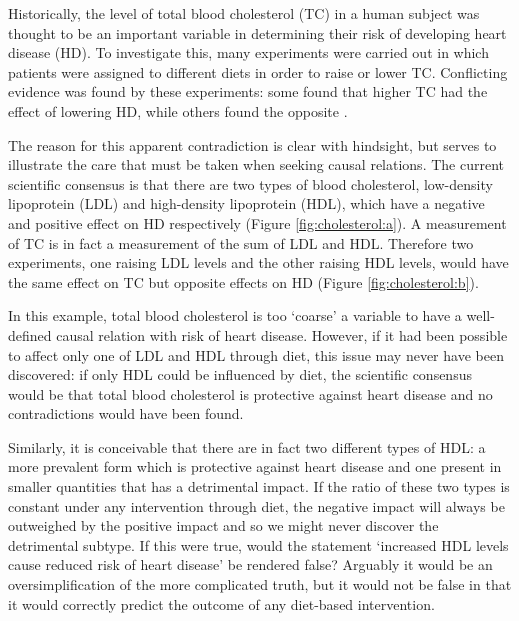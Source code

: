 

Historically, the level of total blood cholesterol (TC) in a human subject was thought to be an important variable in determining their risk of developing heart disease (HD).
To investigate this, many experiments were carried out in which patients were assigned to different diets in order to raise or lower TC\@.
Conflicting evidence was found by these experiments: some found that higher TC had the effect of lowering HD, while others found the opposite \citep{truswell2010cholesterol,steinberg2011cholesterol}.

The reason for this apparent contradiction is clear with hindsight, but serves to illustrate the care that must be taken when seeking causal relations. 
The current scientific consensus is that there are two types of blood cholesterol, low-density lipoprotein (LDL) and high-density lipoprotein (HDL), which have a negative and positive effect on HD respectively (Figure \ref{fig:cholesterol:a}).
A measurement of TC is in fact a measurement of the sum of LDL and HDL.
Therefore two experiments, one raising LDL levels and the other raising HDL levels, would have the same effect on TC but opposite effects on HD (Figure \ref{fig:cholesterol:b}).

In this example, total blood cholesterol is too `coarse' a variable to have a well-defined causal relation with risk of heart disease. 
However, if it had been possible to affect only one of LDL and HDL through diet, this issue may never have been discovered:
if only HDL could be influenced by diet, the scientific consensus would be that total blood cholesterol is protective against heart disease and no contradictions would have been found.

Similarly, it is conceivable that there are in fact two different types of HDL: a more prevalent form which is protective against heart disease and one present in smaller quantities that has a detrimental impact. 
If the ratio of these two types is constant under any intervention through diet, the negative impact will always be outweighed by the positive impact and so we might never discover the detrimental subtype. 
If this were true, would the statement `increased HDL levels cause reduced risk of heart disease' be rendered false? 
Arguably it would be an oversimplification of the more complicated truth, but it would not be false in that it would correctly predict the outcome of any diet-based intervention.

